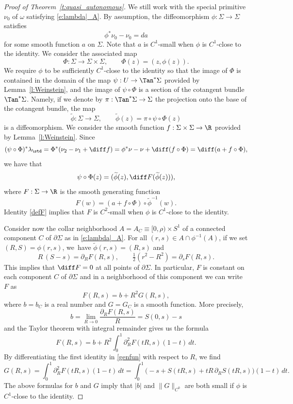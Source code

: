 \begin{proof}[Proof of Theorem~\ref{t:quasi_autonomous}]
We still work with the special primitive $\nu_0$ of $\omega$ satisfying \eqref{e:lambda|_A}.
By assumption, the diffeomorphism $\phi: \Sigma \to \Sigma$ satisfies
\[
\phi^* \nu_0 - \nu_0 = da
\]
for some smooth function $a$ on $\Sigma$. Note that $a$ is $C^1$-small when $\phi$ is $C^1$-close to the identity. We consider the associated map
\[
\Phi: \Sigma \to \Sigma \times \Sigma, \qquad \Phi(z) = (z,\phi(z)).
\]
We require $\phi$ to be sufficiently $C^1$-close to the identity so that the image of $\Phi$ is contained in the domain of the map $\psi:U\to\Tan^*\Sigma$ provided by Lemma~\ref{l:Weinstein}, and the image of $\psi\circ\Phi$ is a section of the cotangent bundle $\Tan^*\Sigma$. Namely, if we denote by $\pi:\Tan^*\Sigma\to\Sigma$ the projection onto the base of the cotangent bundle, the map
\[
\widetilde\phi:\Sigma\to\Sigma,
\qquad
\widetilde\phi(z)=\pi\circ\psi\circ\Phi(z)
\]
is a diffeomorphism.
We consider the smooth function $f:\Sigma\times\Sigma\to\R$ provided by Lemma~\ref{l:Weinstein}.
Since
\[
(\psi\circ\Phi)^*\lambda_{\std}
=
\Phi^*(\nu_2-\nu_1+\diff f)
=
\phi^*\nu-\nu+\diff(f\circ\Phi)
=
\diff( a+f\circ\Phi),
\]
we have that
\begin{equation}
\label{defF}
\psi\circ\Phi(z)=(\widetilde\phi(z),\diff F(\widetilde\phi(z))),
\end{equation}
where $F:\Sigma\to\R$ is the smooth generating function
\[
F(w)=( a+f\circ\Phi)\circ\widetilde\phi^{-1}(w).
\]
Identity \eqref{defF} implies that $F$ is $C^2$-small when $\phi$ is $C^1$-close to the identity.

Consider now the collar neighborhood $A=A_C\equiv[0,\rho)\times S^1$ of a connected component $C$ of $\partial\Sigma$ as in \eqref{e:lambda|_A}. For all $(r,s)\in A\cap\phi^{-1}(A)$, if we set $(R,S)=\phi(r,s)$, we~have $\widetilde\phi(r,s)=(R,s)$ and
\begin{equation}
\label{genfun}
R\,(S-s) = \partial_R F(R,s),\qquad
\tfrac 12 (r^2-R^2) = \partial_s F(R,s).
\end{equation}
This implies that $\diff F=0$ at all points of $\partial\Sigma$. In particular, $F$ is constant on each component $C$ of $\partial \Sigma$ and in a neighborhood of this component we can write $F$ as
\begin{equation}
\label{Fnearbdry}
F(R,s)=b+ R^2G(R,s),
\end{equation}
where $b=b_C$ is a real number and $G=G_C$ is a smooth function. More precisely,
\[
b= \lim_{R\to 0} \frac{\partial_R F(R,s)}{R} = S(0,s) - s
\]
and the Taylor theorem with integral remainder gives us the formula
\[
F(R,s) = b + R^2 \int_0^1 \partial_R^2 F(tR,s) (1-t)\, dt.
\]
By differentiating the first identity in \eqref{genfun} with respect to $R$, we find
\[
G(R,s) = \int_0^1 \partial_R^2 F(tR,s) (1-t)\, dt = \int_0^1 \bigl( -s + S(tR,s) + tR \,\partial_R S(tR,s) \bigr) (1-t)\, dt.
\]
The above formulas for $b$ and $G$ imply that $|b|$ and $\|G\|_{C^0}$ are both small if $\phi$ is $C^1$-close to the identity.


\end{proof}
